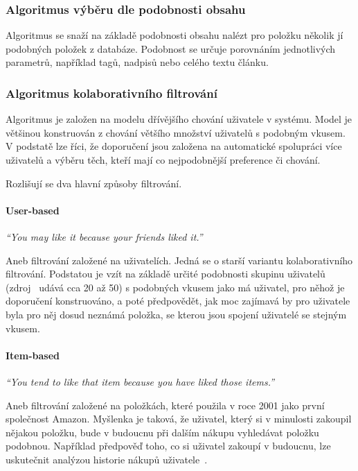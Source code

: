 \documentclass[thesis=M,czech]{FITthesis}[2014/05/07]
\begin{document}
\subsubsection{Algoritmus výběru dle podobnosti obsahu}

Algoritmus se snaží na základě podobnosti obsahu nalézt pro položku několik jí podobných položek z databáze. Podobnost se určuje porovnáním jednotlivých parametrů, například tagů, nadpisů nebo celého textu článku.

\subsubsection{Algoritmus kolaborativního filtrování}

Algoritmus je založen na modelu dřívějšího chování uživatele v systému. Model je většinou konstruován z chování většího množství uživatelů s podobným vkusem. V podstatě lze říci, že doporučení jsou založena na automatické spolupráci více uživatelů a výběru těch, kteří mají co nejpodobnější preference či chování.

Rozlišují se dva hlavní způsoby filtrování.

\paragraph{User-based}

\emph{``You may like it because your friends liked it.''}~\cite{cf}

Aneb filtrování založené na uživatelích. Jedná se o starší variantu kolaborativního filtrování. Podstatou je vzít na základě určité podobnosti skupinu uživatelů (zdroj~\cite{cf} udává cca 20 až 50) s podobných vkusem jako má uživatel, pro něhož je doporučení konstruováno, a poté předpovědět, jak moc zajímavá by pro uživatele byla pro něj dosud neznámá položka, se kterou jsou spojení uživatelé se stejným vkusem.

\paragraph{Item-based}

\emph{``You tend to like that item because you have liked those items.''}~\cite{cf}

Aneb filtrování založené na položkách, které použila v roce 2001 jako první společnost Amazon. Myšlenka je taková, že uživatel, který si v minulosti zakoupil nějakou položku, bude v budoucnu při dalším nákupu vyhledávat položku podobnou. Například předpověď toho, co si uživatel zakoupí v budoucnu, lze uskutečnit analýzou historie nákupů uživatele~\cite{itemcf}. 
\end{document}

